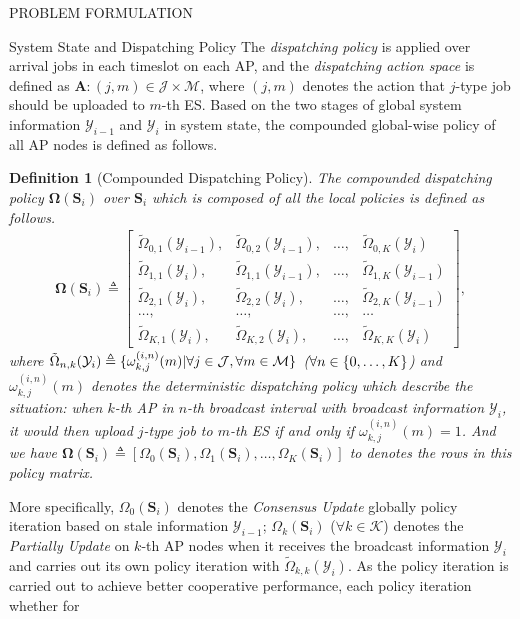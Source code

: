 \documentclass[10pt, conference, letterpaper]{IEEEtran}
\newtheorem{definition}{Definition}
\newcommand{\define}{\triangleq}
\newcommand{\vecG}{\boldsymbol}
\DeclarePairedDelimiter{\set}{\{}{\}}
\newcommand{\apSet}{\mathcal{K}}
\newcommand{\esSet}{\mathcal{M}}
\newcommand{\jSpace}{\mathcal{J}}
\newcommand{\Stat}{\mathbf{S}}
\newcommand{\Obsv}{\mathcal{Y}}
\newcommand{\Policy}{\boldsymbol{\Omega}}
\begin{document}
\begin{section}{PROBLEM FORMULATION}
\begin{subsection}{System State and Dispatching Policy}
            The \emph{dispatching policy} is applied over arrival jobs in each timeslot on each AP, and the \emph{dispatching action space} is defined as $\mathbf{A}: (j, m) \in \jSpace \times \esSet$, where $(j, m)$ denotes the action that $j$-type job should be uploaded to $m$-th ES.
            Based on the two stages of global system information $\Obsv_{i-1}$ and $\Obsv_{i}$ in system state, the compounded global-wise policy of all AP nodes is defined as follows.
            \begin{definition}[Compounded Dispatching Policy]
                The compounded dispatching policy $\Policy(\Stat_{i})$ over $\Stat_{i}$ which is composed of all the local policies is defined as follows.
                \begin{align}
                    \Policy(\Stat_{i}) \define
                    \begin{bmatrix}
                        \tilde{\Omega}_{0,1}(\Obsv_{i-1}), &\tilde{\Omega}_{0,2}(\Obsv_{i-1}), &\dots, &\tilde{\Omega}_{0,K}(\Obsv_{i}) \\
                        \tilde{\Omega}_{1,1}(\Obsv_{i}), &\tilde{\Omega}_{1,1}(\Obsv_{i-1}), &\dots, &\tilde{\Omega}_{1,K}(\Obsv_{i-1}) \\
                        \tilde{\Omega}_{2,1}(\Obsv_{i}), &\tilde{\Omega}_{2,2}(\Obsv_{i}), &\dots, &\tilde{\Omega}_{2,K}(\Obsv_{i-1}) \\
                        \dots, &\dots, &\dots, &\dots \\
                        \tilde{\Omega}_{K,1}(\Obsv_{i}), &\tilde{\Omega}_{K,2}(\Obsv_{i}), &\dots, &\tilde{\Omega}_{K,K}(\Obsv_{i})
                    \end{bmatrix},
                \end{align}
                where $\tilde{\Omega}_{n,k}(\Obsv_{i}) \define \set{\omega^{(i,n)}_{k,j}(m)|\forall j\in\jSpace, \forall m\in\esSet}$ ($\forall n\in\set{0,\dots,K}$) and $\omega^{(i,n)}_{k,j}(m)$ denotes the deterministic dispatching policy which describe the situation: when $k$-th AP in $n$-th broadcast interval with broadcast information $\Obsv_{i}$, it would then upload $j$-type job to $m$-th ES if and only if $\omega^{(i,n)}_{k,j}(m)=1$.
                And we have $\vecG{\Omega}(\Stat_{i}) \define [\Omega_{0}(\Stat_i), \Omega_{1}(\Stat_i), \dots, \Omega_{K}(\Stat_i)]$ to denotes the rows in this policy matrix.
            \end{definition}
            More specifically,
            $\Omega_{0}(\Stat_{i})$ denotes the \emph{Consensus Update} globally policy iteration based on stale information $\Obsv_{i-1}$;
            $\Omega_{k}(\Stat_{i})$ ($\forall k\in\apSet$) denotes the \emph{Partially Update} on $k$-th AP nodes when it receives the broadcast information $\Obsv_i$ and carries out its own policy iteration with $\tilde{\Omega}_{k,k}(\Obsv_i)$.
            As the policy iteration is carried out to achieve better cooperative performance, each policy iteration whether for 
            

\end{subsection}
\end{section}
\end{document}
